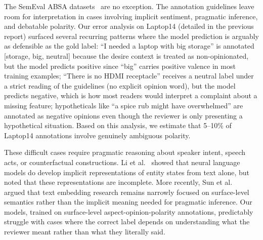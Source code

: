 \documentclass[12pt,a4paper]{report}
\begin{document}
The SemEval ABSA datasets~\cite{pontiki2014semeval} are no exception. The annotation guidelines leave room for interpretation in cases involving implicit sentiment, pragmatic inference, and debatable polarity. Our error analysis on Laptop14 (detailed in the previous report) surfaced several recurring patterns where the model prediction is arguably as defensible as the gold label: ``I needed a laptop with big storage'' is annotated [storage, big, neutral] because the desire context is treated as non-opinionated, but the model predicts positive since ``big'' carries positive valence in most training examples; ``There is no HDMI receptacle'' receives a neutral label under a strict reading of the guidelines (no explicit opinion word), but the model predicts negative, which is how most readers would interpret a complaint about a missing feature; hypotheticals like ``a spice rub might have overwhelmed'' are annotated as negative opinions even though the reviewer is only presenting a hypothetical situation. Based on this analysis, we estimate that 5--10\% of Laptop14 annotations involve genuinely ambiguous polarity.

These difficult cases require pragmatic reasoning about speaker intent, speech acts, or counterfactual constructions. Li et al.~\cite{li2021implicit} showed that neural language models do develop implicit representations of entity states from text alone, but noted that these representations are incomplete. More recently, Sun et al.~\cite{sun2025implicit} argued that text embedding research remains narrowly focused on surface-level semantics rather than the implicit meaning needed for pragmatic inference. Our models, trained on surface-level aspect-opinion-polarity annotations, predictably struggle with cases where the correct label depends on understanding what the reviewer meant rather than what they literally said.
\end{document}
